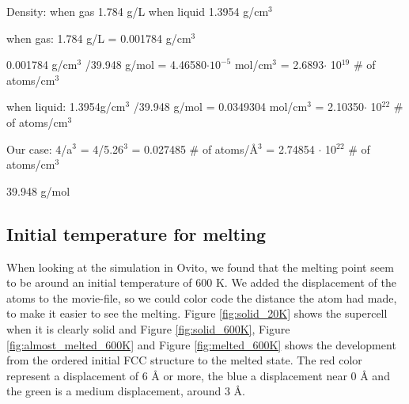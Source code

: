 

Density:
when gas 1.784 g/L
when liquid 1.3954 g/cm$^3$

when gas:
1.784 g/L = 0.001784 g/cm$^3$

0.001784 g/cm$^3$ /39.948 g/mol = 4.46580$\cdot 10^{-5}$ mol/cm$^3$ = 2.6893$\cdot$ 10$^{19}$ \# of atoms/cm$^3$

when liquid:
1.3954g/cm$^3$ /39.948 g/mol = 0.0349304 mol/cm$^3$ = 2.10350$\cdot$ 10$^{22}$ \# of atoms/cm$^3$

Our case:
4/a$^3$ = 4/5.26$^3$ = 0.027485 \# of atoms/Å$^3$ = 2.74854 $\cdot$ 10$^{22}$ \# of atoms/cm$^3$


39.948 g/mol

\subsection{Initial temperature for melting}

When looking at the simulation in Ovito, we found that the melting point seem to be around an initial temperature of 600 K. We added the displacement of the atoms to the movie-file, so we could color code the distance the atom had made, to make it easier to see the melting. Figure \ref{fig:solid_20K} shows the supercell when it is clearly solid and Figure \ref{fig:solid_600K}, Figure \ref{fig:almost_melted_600K} and Figure \ref{fig:melted_600K} shows the development from the ordered initial FCC structure to the melted state. The red color represent a displacement of 6 Å or more, the blue a displacement near 0 Å and the green is a medium displacement, around 3 Å. 


